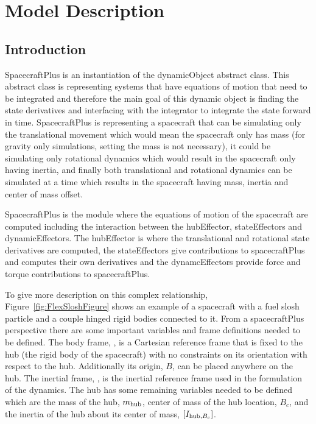 

\section{Model Description}

\subsection{Introduction}

SpacecraftPlus is an instantiation of the dynamicObject abstract class. This abstract class is representing systems that have equations of motion that need to be integrated and therefore the main goal of this dynamic object is finding the state derivatives and interfacing with the integrator to integrate the state forward in time. SpacecraftPlus is representing a spacecraft that can be simulating only the translational movement which would mean the spacecraft only has mass (for gravity only simulations, setting the mass is not necessary), it could be simulating only rotational dynamics which would result in the spacecraft only having inertia, and finally both translational and rotational dynamics can be simulated at a time which results in the spacecraft having mass, inertia and center of mass offset.

SpacecraftPlus is the module where the equations of motion of the spacecraft are computed including the interaction between the hubEffector, stateEffectors and dynamicEffectors. The hubEffector is where the translational and rotational state derivatives are computed, the stateEffectors give contributions to spacecraftPlus and computes their own derivatives and the dynamcEffectors provide force and torque contributions to spacecraftPlus.

To give more description on this complex relationship, Figure~\ref{fig:FlexSloshFigure} shows an example of a spacecraft with a fuel slosh particle and a couple hinged rigid bodies connected to it. From a spacecraftPlus perspective there are some important variables and frame definitions needed to be defined. The body frame, , is a Cartesian reference frame that is fixed to the hub (the rigid body of the spacecraft) with no constraints on its orientation with respect to the hub. Additionally its origin, $B$, can be placed anywhere on the hub. The inertial frame, , is the inertial reference frame used in the formulation of the dynamics. The hub has some remaining variables needed to be defined which are the mass of the hub, $m_{\textnormal{hub}}$, center of mass of the hub location, $B_c$, and the inertia of the hub about its center of mass, $[I_{\textnormal{hub},B_c}]$. 

